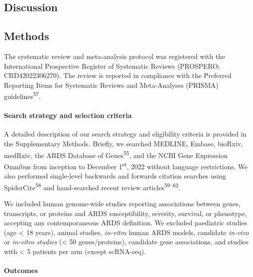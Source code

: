 \documentclass[
  11,
  a4paper,
]{article}
\let\oldparagraph\paragraph
\renewcommand{\paragraph}[1]{\oldparagraph{#1}\mbox{}}
\begin{document}
\newpage

\hypertarget{discussion}{%
\subsection{Discussion}\label{discussion}}

\hypertarget{methods}{%
\subsection{Methods}\label{methods}}

The systematic review and meta-analysis protocol was registered with the
International Prospective Register of Systematic Reviews (PROSPERO;
CRD42022306270). The review is reported in compliance with the Preferred
Reporting Items for Systematic Reviews and Meta-Analyses (PRISMA)
guidelines\textsuperscript{57}.

\hypertarget{search-strategy-and-selection-criteria}{%
\paragraph{Search strategy and selection
criteria}\label{search-strategy-and-selection-criteria}}

A detailed description of our search strategy and eligibility criteria
is provided in the Supplementary Methods. Briefly, we searched MEDLINE,
Embase, bioRxiv, medRxiv, the ARDS Database of
Genes\textsuperscript{55}, and the NCBI Gene Expression Omnibus from
inception to December 1\textsuperscript{st}, 2022 without language
restrictions. We also performed single-level backwards and forwards
citation searches using SpiderCite\textsuperscript{58} and hand-searched
recent review articles\textsuperscript{59--62}.

We included human genome-wide studies reporting associations between
genes, transcripts, or proteins and ARDS susceptibility, severity,
survival, or phenotype, accepting any contemporaneous ARDS definition.
We excluded paediatric studies (age \textless{} 18 years), animal
studies, \emph{in-vitro} human ARDS models, candidate \emph{in-vivo} or
\emph{in-vitro studies} (\textless{} 50 genes/proteins), candidate gene
associations, and studies with \textless{} 5 patients per arm (except
scRNA-seq).

\hypertarget{outcomes}{%
\paragraph{Outcomes}\label{outcomes}}
\end{document}
